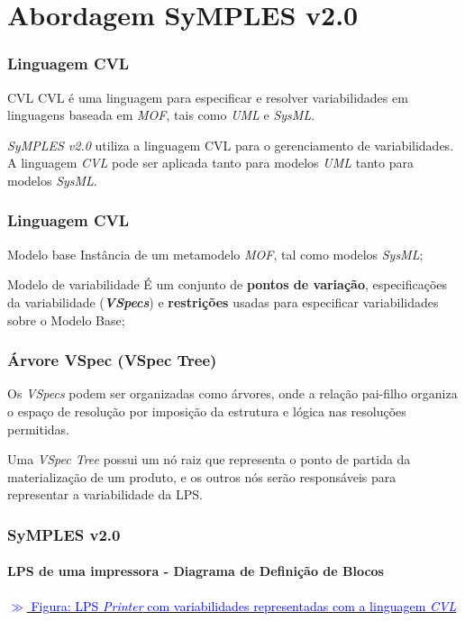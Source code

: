 \section{Abordagem SyMPLES v2.0}



\begin{frame}
\frametitle{Linguagem CVL}

\begin{block}{CVL}
   CVL é uma linguagem para especificar e resolver variabilidades em linguagens baseada em \textit{MOF}, tais como \textit{UML} e \textit{SysML}.
\end{block}

\textit{SyMPLES v2.0} utiliza a linguagem CVL para o gerenciamento de variabilidades. A linguagem \textit{CVL} pode ser aplicada tanto para modelos \textit{UML} tanto para modelos \textit{SysML}.

\end{frame}

\begin{frame}
\frametitle{Linguagem CVL}

\begin{block}{Modelo base}
   Instância de um metamodelo \textit{MOF}, tal como modelos \textit{SysML};
\end{block}

\begin{block}{Modelo de variabilidade}
   É um conjunto de \textbf{pontos de variação}, especificações da variabilidade (\textbf{\textit{VSpecs}}) e \textbf{restrições} usadas para especificar variabilidades sobre o Modelo Base;
\end{block}

\end{frame}

\begin{frame}
\frametitle{Árvore VSpec (VSpec Tree)}

Os \textit{VSpecs} podem ser organizadas como árvores, onde a relação pai-filho organiza o espaço de resolução por imposição da estrutura e lógica nas resoluções permitidas.

Uma \textit{VSpec Tree} possui um nó raiz que representa o ponto de partida da materialização de um produto, e os outros nós serão responsáveis para representar a variabilidade da LPS.

\end{frame}

\begin{frame}
\frametitle{SyMPLES v2.0}
\framesubtitle{LPS de uma impressora - Diagrama de Definição de Blocos}

  \href{run:./material/printer2-blocks-cvl.pdf}{\textcolor{blue}{$\gg$ Figura: LPS \textit{Printer} com variabilidades representadas com a linguagem \textit{CVL}}}

\end{frame}

